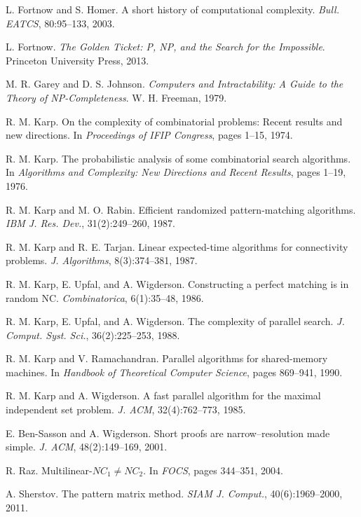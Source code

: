 \documentclass[11pt]{article}
\theoremstyle{definition}
\begin{document}
\begin{thebibliography}{99}
 L. Fortnow and S. Homer. A short history of computational complexity. \emph{Bull. EATCS}, 80:95--133, 2003.

 L. Fortnow. \emph{The Golden Ticket: P, NP, and the Search for the Impossible}. Princeton University Press, 2013.

 M. R. Garey and D. S. Johnson. \emph{Computers and Intractability: A Guide to the Theory of NP-Completeness}. W. H. Freeman, 1979.

 R. M. Karp. On the complexity of combinatorial problems: Recent results and new directions. In \emph{Proceedings of IFIP Congress}, pages 1--15, 1974.

 R. M. Karp. The probabilistic analysis of some combinatorial search algorithms. In \emph{Algorithms and Complexity: New Directions and Recent Results}, pages 1--19, 1976.

 R. M. Karp and M. O. Rabin. Efficient randomized pattern-matching algorithms. \emph{IBM J. Res. Dev.}, 31(2):249--260, 1987.

 R. M. Karp and R. E. Tarjan. Linear expected-time algorithms for connectivity problems. \emph{J. Algorithms}, 8(3):374--381, 1987.

 R. M. Karp, E. Upfal, and A. Wigderson. Constructing a perfect matching is in random NC. \emph{Combinatorica}, 6(1):35--48, 1986.

 R. M. Karp, E. Upfal, and A. Wigderson. The complexity of parallel search. \emph{J. Comput. Syst. Sci.}, 36(2):225--253, 1988.

 R. M. Karp and V. Ramachandran. Parallel algorithms for shared-memory machines. In \emph{Handbook of Theoretical Computer Science}, pages 869--941, 1990.

 R. M. Karp and A. Wigderson. A fast parallel algorithm for the maximal independent set problem. \emph{J. ACM}, 32(4):762--773, 1985.

 E. Ben-Sasson and A. Wigderson. Short proofs are narrow--resolution made simple. \emph{J. ACM}, 48(2):149--169, 2001.

 R. Raz. Multilinear-$NC_1 \neq NC_2$. In \emph{FOCS}, pages 344--351, 2004.

 A. Sherstov. The pattern matrix method. \emph{SIAM J. Comput.}, 40(6):1969--2000, 2011.

\end{thebibliography}
\end{document}
